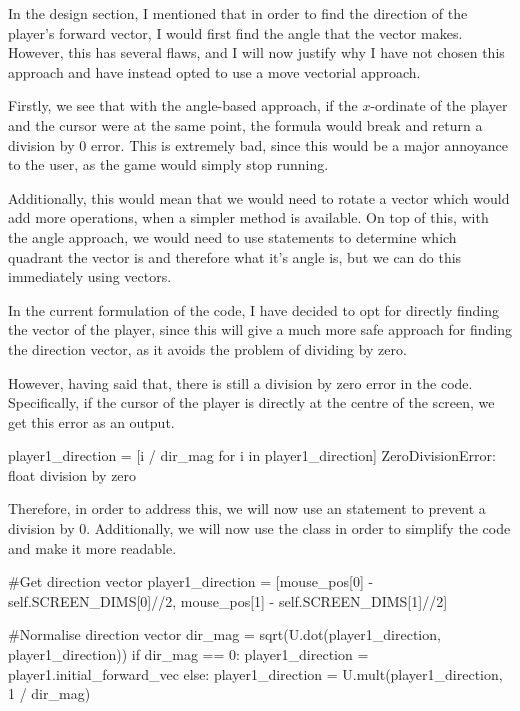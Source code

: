 In the design section, I mentioned that in order to find the direction of the player's forward vector, I would first find the angle that the vector makes. However, this has several flaws, and I will now justify why I have not chosen this approach and have instead opted to use a move vectorial approach.

\vs
Firstly, we see that with the angle-based approach, if the $x$-ordinate of the player and the cursor were at the same point, the formula would break and return a division by 0 error. This is extremely bad, since this would be a major annoyance to the user, as the game would simply stop running.
\vs

Additionally, this would mean that we would need to rotate a vector which would add more operations, when a simpler method is available. On top of this, with the angle approach, we would need to use  statements to determine which quadrant the vector is and therefore what it's angle is, but we can do this immediately using vectors.

\vs
In the current formulation of the code, I have decided to opt for directly finding the vector of the player, since this will give a much more safe approach for finding the direction vector, as it avoids the problem of dividing by zero.

\vs
However, having said that, there is still a division by zero error in the code. Specifically, if the cursor of the player is directly at the centre of the screen, we get this error as an output.

\vs
\begin{mpy}
    player1_direction = [i / dir_mag for i in player1_direction]
ZeroDivisionError: float division by zero
\end{mpy}

Therefore, in order to address this, we will now use an  statement to prevent a division by 0. Additionally, we will now use the  class in order to simplify the code and make it more readable.

\begin{mpy}
            #Get direction vector
            player1_direction = [mouse_pos[0] - self.SCREEN_DIMS[0]//2, mouse_pos[1] - self.SCREEN_DIMS[1]//2]

            #Normalise direction vector
            dir_mag = sqrt(U.dot(player1_direction, player1_direction))
            if dir_mag == 0:
                player1_direction = player1.initial_forward_vec
            else:
                player1_direction = U.mult(player1_direction, 1 / dir_mag)

\end{mpy}

